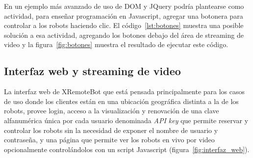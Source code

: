 En un ejemplo más avanzado de uso de DOM y JQuery podría plantearse como
actividad, para enseñar programación en Javascript, agregar una botonera para
controlar a los robots haciendo clic.
El código~\ref{lst:botones} muestra una posible solución a esa actividad,
agregando los botones debajo del área de streaming de video y la
figura~\ref{fig:botones} muestra el resultado de ejecutar este código.





\subsection{Interfaz web y streaming de video}

La interfaz web de XRemoteBot
que está pensada principalmente para los casos
de uso donde los clientes están en una ubicación geográfica distinta a la de
los robots, provee login, acceso a la visualización y renovación de una
clave alfanumérica única por cada usuario denominada \textit{API key} que
permite reservar y controlar los robots sin la necesidad de exponer el nombre
de usuario y contraseña, y una página que permite ver los robots en vivo por
video opcionalmente controlándolos con un script Javascript
(figura~\ref{fig:interfaz_web}).

